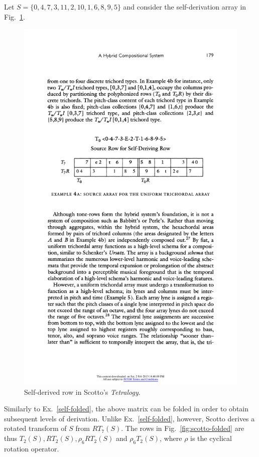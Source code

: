 \begin{example}
    \cite[180]{Scotto2000}
    \label{ex:scotto}
    Let $S = \{ 0, 4, 7, 3, 11, 2, 10, 1, 6, 8, 9, 5 \}$ and consider the self-derivation array in Fig.~\ref{fig:scotto-array}.
    \begin{figure}[H]
    	\centering
    	\includegraphics[width=5in]{figures/scotto-array.pdf}
		\caption[Self-derived row in Scotto's \emph{Tetralogy}]{Self-derived row in Scotto's \emph{Tetralogy}.}
    	\label{fig:scotto-array}
	\end{figure}
	\noindent Similarly to Ex.~\ref{self-folded}, the above matrix can be folded in order to obtain subsequent levels of derivation. Unlike Ex.~\ref{self-folded}, however, Scotto derives a rotated transform of $S$ from $RT_7(S)$. The rows in Fig.~\ref{fig:scotto-folded} are thus $T_2(S), RT_2(S), \rho_6RT_2(S)$ and $\rho_6T_2(S)$, where $\rho$ is the cyclical rotation operator.

\end{example}
